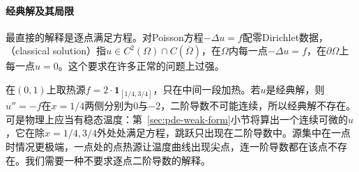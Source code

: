 \paragraph{经典解及其局限}
最直接的解释是逐点满足方程。对Poisson方程$-\Delta u=f$配零Dirichlet数据，（classical solution）指$u\in C^2(\Omega)\cap C(\overline\Omega)$，在$\Omega$内每一点$-\Delta u=f$，在$\partial\Omega$上每一点$u=0$。这个要求在许多正常的问题上过强。

在$(0,1)$上取热源$f=2\cdot\mathbf 1_{[1/4,3/4]}$，只在中间一段加热。若$u$是经典解，则$u''=-f$在$x=1/4$两侧分别为$0$与$-2$，二阶导数不可能连续，所以经典解不存在。可是物理上应当有稳态温度：第~\ref{sec:pde-weak-form}小节将算出一个连续可微的$u$，它在除$x=1/4,3/4$外处处满足方程，跳跃只出现在二阶导数中。源集中在一点时情况更极端，一点处的点热源让温度曲线出现尖点，连一阶导数都在该点不存在。我们需要一种不要求逐点二阶导数的解释。

